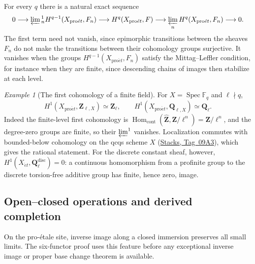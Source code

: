 \documentclass[11pt,a4paper]{article}
\numberwithin{equation}{section}
\theoremstyle{definition}
\theoremstyle{remark}
\newcommand{\et}{\acute{e}t}
\newcommand{\proet}{\mathrm{pro}\acute{e}t}
\newcommand{\stacks}[1]{\href{https://stacks.math.columbia.edu/tag/#1}{\textnormal{Stacks, Tag~#1}}}
\newtheorem{example}[theorem]{Example}
\begin{document}
For every $q$ there is a natural exact sequence
\begin{equation}\label{pe:eq:continuous-milnor}
0\longrightarrow\varprojlim
 {}^1_nH^{q-1}(X_{\proet},F_n)
\longrightarrow H^q(X_{\proet},F)
\longrightarrow\varprojlim_nH^q(X_{\proet},F_n)
\longrightarrow0.
\end{equation}
The first term need not vanish, since epimorphic transitions between
the sheaves $F_n$ do not make the transitions between their
cohomology groups surjective. It vanishes when the groups
$H^{q-1}(X_{\proet},F_n)$ satisfy the Mittag--Leffler condition, for
instance when they are finite, since descending chains of images then
stabilize at each level.

\begin{example}[The first cohomology of a finite field]
\label{pe:finite-field-adic}
For $X=\operatorname{Spec}\mathbb F_q$ and $\ell\nmid q$,
\[
 H^1(X_{\proet},\mathbf Z_{\ell,X})\simeq\mathbf Z_\ell,
 \qquad H^1(X_{\proet},\mathbf Q_{\ell,X})\simeq\mathbf Q_\ell.
\]
Indeed the finite-level first cohomology is
$\operatorname{Hom}_{\mathrm{cont}}(\widehat{\mathbf Z},
\mathbf Z/\ell^n)=\mathbf Z/\ell^n$, and the degree-zero groups are
finite, so their $\varprojlim^1$ vanishes. Localization commutes with
bounded-below cohomology on the qcqs scheme $X$ (\stacks{09A3}), which
gives the rational statement. For the discrete constant sheaf,
however, $H^1(X_{\et},\mathbf Q_\ell^{\mathrm{disc}})=0$: a
continuous homomorphism from a profinite group to the discrete
torsion-free additive group has finite, hence zero, image.
\end{example}
\subsection{Open--closed operations and derived completion}
\label{pe:localization-completion}

On the pro-\'etale site, inverse image along a closed immersion
preserves all small limits. The six-functor proof uses this feature
before any exceptional inverse image or proper base change theorem is
available.
\end{document}
